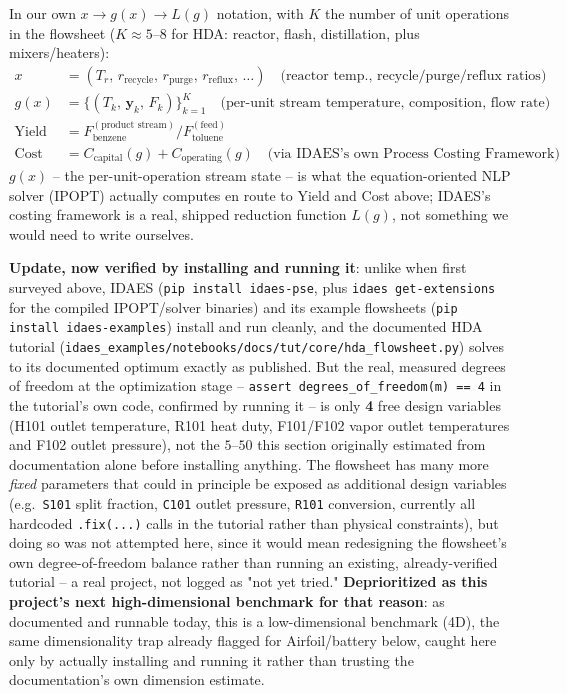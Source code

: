 \documentclass[11pt]{article}
\begin{document}
In our own $x \to g(x) \to L(g)$ notation, with $K$ the number of unit
operations in the flowsheet ($K \approx 5$--$8$ for HDA: reactor, flash,
distillation, plus mixers/heaters):
\begin{align}
x &= (T_r, \, r_{\text{recycle}}, \, r_{\text{purge}}, \, r_{\text{reflux}}, \, \ldots) \quad \text{(reactor temp., recycle/purge/reflux ratios)} \\
g(x) &= \{(T_k, \, \mathbf{y}_k, \, F_k)\}_{k=1}^{K} \quad \text{(per-unit stream temperature, composition, flow rate)} \\
\text{Yield} &= F_{\text{benzene}}^{(\text{product stream})} \big/ F_{\text{toluene}}^{(\text{feed})} \\
\text{Cost} &= C_{\text{capital}}(g) + C_{\text{operating}}(g) \quad \text{(via IDAES's own Process Costing Framework)}
\end{align}
$g(x)$ -- the per-unit-operation stream state -- is what the
equation-oriented NLP solver (IPOPT) actually computes en route to
Yield and Cost above; IDAES's costing framework is a real, shipped
reduction function $L(g)$, not something we would need to write
ourselves.

\textbf{Update, now verified by installing and running it}: unlike when
first surveyed above, IDAES (\texttt{pip install idaes-pse}, plus
\texttt{idaes get-extensions} for the compiled IPOPT/solver binaries)
and its example flowsheets (\texttt{pip install idaes-examples}) install
and run cleanly, and the documented HDA tutorial
(\texttt{idaes\_examples/notebooks/docs/tut/core/hda\_flowsheet.py})
solves to its documented optimum exactly as published. But the real,
measured degrees of freedom at the optimization stage --
\texttt{assert degrees\_of\allowbreak\_freedom(m) == 4} in the tutorial's own
code, confirmed by running it -- is only \textbf{4} free design
variables (H101 outlet temperature, R101 heat duty, F101/F102 vapor
outlet temperatures and F102 outlet pressure), not the $5$--$50$ this
section originally estimated from documentation alone before
installing anything. The flowsheet has many more \emph{fixed}
parameters that could in principle be exposed as additional design
variables (e.g.\ \texttt{S101} split fraction, \texttt{C101} outlet
pressure, \texttt{R101} conversion, currently all hardcoded
\texttt{.fix(...)} calls in the tutorial rather than physical
constraints), but doing so was not attempted here, since it would mean
redesigning the flowsheet's own degree-of-freedom balance rather than
running an existing, already-verified tutorial -- a real project, not
logged as "not yet tried." \textbf{Deprioritized as this project's next
high-dimensional benchmark for that reason}: as documented and
runnable today, this is a low-dimensional benchmark (4D), the same
dimensionality trap already flagged for Airfoil/battery below, caught
here only by actually installing and running it rather than trusting
the documentation's own dimension estimate.
\end{document}
